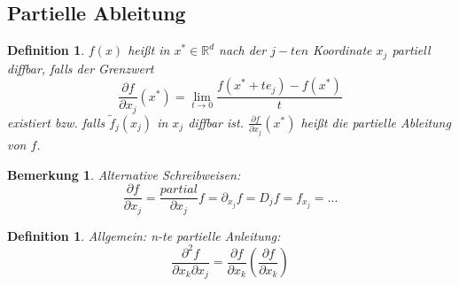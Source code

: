 \documentclass[12pt,a4paper]{article}%
\newtheorem{definition}[satz]{Definition}
\newtheorem{bem}{Bemerkung}[section]
\numberwithin{equation}{section}
\newcommand{\R}{\mathbb{R}} %
\newcommand{\diffp}{\partial}
\numberwithin{equation}{subsection}
\begin{document}
  \subsection{Partielle Ableitung}
  \begin{definition}
    $f(x)$ heißt in $x^* \in \R^d$ nach der $j-ten$ Koordinate $x_j$ partiell diffbar, falls der Grenzwert
    \begin{equation}
      \frac{\partial f}{\partial x_j}(x^*) = \lim\limits_{t\rightarrow 0} \frac{f(x^* + t e_j) - f(x^*)}{t}
    \end{equation}
    existiert bzw. falls $\tilde{f}_j(x_j)$ in $x_j$ diffbar ist. $\frac{\partial f}{\partial x_j}(x^*)$ heißt die partielle Ableitung von $f$. 
  \end{definition}
  \begin{bem}
    Alternative Schreibweisen:
    \begin{equation}
      \frac{\partial f}{\partial x_j} = \frac{partial}{\partial x_j} f = \partial_{x_j} f = D_j f  = f_{x_j} = ...
    \end{equation}
  \end{bem}
  \begin{definition}
    Allgemein: n-te partielle Anleitung:
    \begin{equation}
      \frac{\diffp^2f}{\diffp x_k \diffp x_j} = \frac{\diffp f}{\diffp x_k}\left(\frac{\diffp f}{\diffp x_k} \right)
    \end{equation}
  \end{definition}
  
\end{document}
